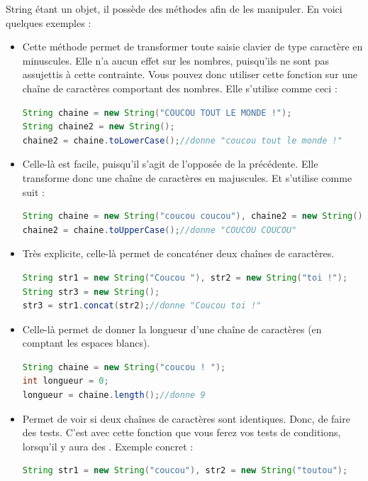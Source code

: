\documentclass[a4paper,twoside]{article}
\begin{document}
String étant un objet, il possède des méthodes afin de les manipuler. En voici quelques exemples :
\begin{itemize}

\item {}

Cette méthode permet de transformer toute saisie clavier de type caractère en minuscules. Elle n'a aucun effet sur les nombres, puisqu'ils ne sont pas assujettis à cette contrainte. Vous pouvez donc utiliser cette fonction sur une chaîne de caractères comportant des nombres.
Elle s'utilise comme ceci :
\begin{lstlisting}[language=java]
String chaine = new String("COUCOU TOUT LE MONDE !");
String chaine2 = new String();
chaine2 = chaine.toLowerCase();//donne "coucou tout le monde !"
\end{lstlisting}


\item {}

Celle-là est facile, puisqu'il s'agit de l'opposée de la précédente. Elle transforme donc une chaîne de caractères en majuscules. Et s'utilise comme suit :
\begin{lstlisting}[language=java]
String chaine = new String("coucou coucou"), chaine2 = new String();
chaine2 = chaine.toUpperCase();//donne "COUCOU COUCOU"
\end{lstlisting}


\item {}

Très explicite, celle-là permet de concaténer deux chaînes de caractères.
\begin{lstlisting}[language=java]
String str1 = new String("Coucou "), str2 = new String("toi !");
String str3 = new String();
str3 = str1.concat(str2);//donne "Coucou toi !"
\end{lstlisting}


\item {}

Celle-là permet de donner la longueur d'une chaîne de caractères (en comptant les espaces blancs).
\begin{lstlisting}[language=java]
String chaine = new String("coucou ! "); 
int longueur = 0;
longueur = chaine.length();//donne 9
\end{lstlisting}


\item {}

Permet de voir si deux chaînes de caractères sont identiques. Donc, de faire des tests. C'est avec cette fonction que vous ferez vos tests de conditions, lorsqu'il y aura des . Exemple concret :
\begin{lstlisting}[language=java]
String str1 = new String("coucou"), str2 = new String("toutou");
 

\end{lstlisting}
\end{itemize}
\end{document}
